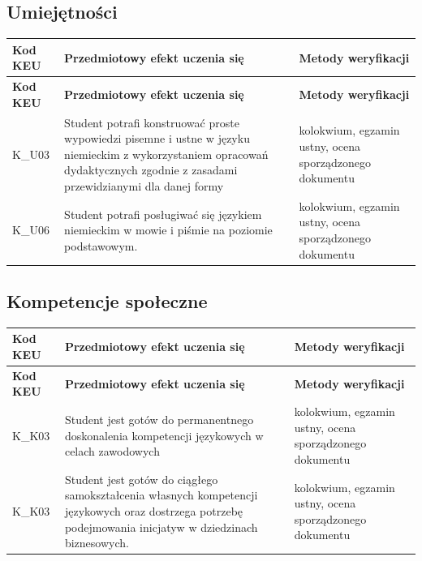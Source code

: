 \documentclass[12pt, a4paper]{article}
\newcommand{\thdrule}{\noalign{\global\setlength{\extrarowheight}{0pt}}}
\newcommand{\thdend}{\noalign{\global\setlength{\extrarowheight}{3pt}}}
\begin{document}
\subsection*{Umiejętności}
{\scriptsize
\begin{longtable}{m{1.6cm}m{9.0cm}m{4.2cm}}
\thdrule\toprule
\rowcolor{pjatkRed} {\color{white}\footnotesize\textbf{\vphantom{Ag}Kod KEU}} & {\color{white}\footnotesize\textbf{\vphantom{Ag}Przedmiotowy efekt uczenia się}} & {\color{white}\footnotesize\textbf{\vphantom{Ag}Metody weryfikacji}} \\
\midrule\thdend
\endfirsthead
\thdrule\toprule
\rowcolor{pjatkRed} {\color{white}\footnotesize\textbf{\vphantom{Ag}Kod KEU}} & {\color{white}\footnotesize\textbf{\vphantom{Ag}Przedmiotowy efekt uczenia się}} & {\color{white}\footnotesize\textbf{\vphantom{Ag}Metody weryfikacji}} \\
\midrule\thdend
\endhead
  \rowcolor{tableRowLight} K\_U03 & Student potrafi konstruować proste wypowiedzi pisemne i ustne w języku niemieckim z wykorzystaniem opracowań dydaktycznych zgodnie z zasadami przewidzianymi dla danej formy & kolokwium, egzamin ustny, ocena sporządzonego dokumentu \\
  \rowcolor{tableRowAlt} K\_U06 & Student potrafi posługiwać się językiem niemieckim w mowie i piśmie na poziomie podstawowym. & kolokwium, egzamin ustny, ocena sporządzonego dokumentu \\
\bottomrule
\end{longtable}}

\subsection*{Kompetencje społeczne}
{\scriptsize
\begin{longtable}{m{1.6cm}m{9.0cm}m{4.2cm}}
\thdrule\toprule
\rowcolor{pjatkRed} {\color{white}\footnotesize\textbf{\vphantom{Ag}Kod KEU}} & {\color{white}\footnotesize\textbf{\vphantom{Ag}Przedmiotowy efekt uczenia się}} & {\color{white}\footnotesize\textbf{\vphantom{Ag}Metody weryfikacji}} \\
\midrule\thdend
\endfirsthead
\thdrule\toprule
\rowcolor{pjatkRed} {\color{white}\footnotesize\textbf{\vphantom{Ag}Kod KEU}} & {\color{white}\footnotesize\textbf{\vphantom{Ag}Przedmiotowy efekt uczenia się}} & {\color{white}\footnotesize\textbf{\vphantom{Ag}Metody weryfikacji}} \\
\midrule\thdend
\endhead
  \rowcolor{tableRowLight} K\_K03 & Student jest gotów do permanentnego doskonalenia kompetencji językowych w celach zawodowych & kolokwium, egzamin ustny, ocena sporządzonego dokumentu \\
  \rowcolor{tableRowAlt} K\_K03 & Student jest gotów do ciągłego samokształcenia własnych kompetencji językowych oraz dostrzega potrzebę podejmowania inicjatyw w dziedzinach biznesowych. & kolokwium, egzamin ustny, ocena sporządzonego dokumentu \\
\bottomrule
\end{longtable}}
\end{document}

